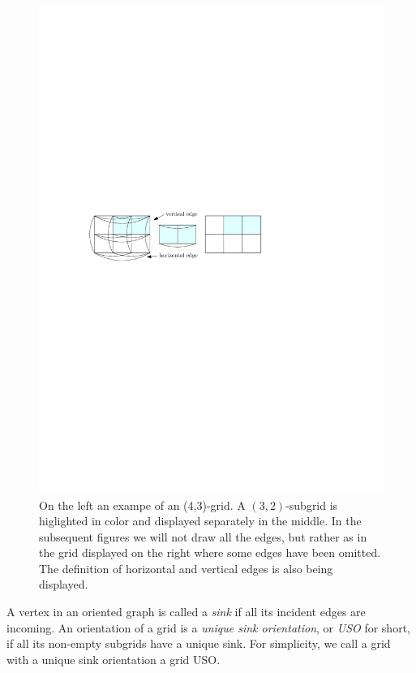 \documentclass[a4paper,10pt]{article}
\begin{document}
  \begin{figure}[htbp] 
  	\centering
  	\includegraphics[scale=1.0]{uso_example.pdf}
  	\caption{\small On the left an exampe of an (4,3)-grid. A $(3,2)$-subgrid is higlighted in color and displayed separately in the middle. In the subsequent figures we will not draw all the edges, but rather as in the grid displayed on the right where some edges have been omitted. The definition of horizontal and vertical edges is also being displayed.} 
  	\label{fig:examplegrid}
  \end{figure}

A vertex in an oriented graph is called a \emph{sink} if all its incident edges are incoming.
An orientation of a grid is a \emph{unique sink orientation}, or \emph{USO}
for short, if all its non-empty subgrids have a unique sink. For simplicity, we call a grid with a unique sink orientation a grid USO.
\end{document}
